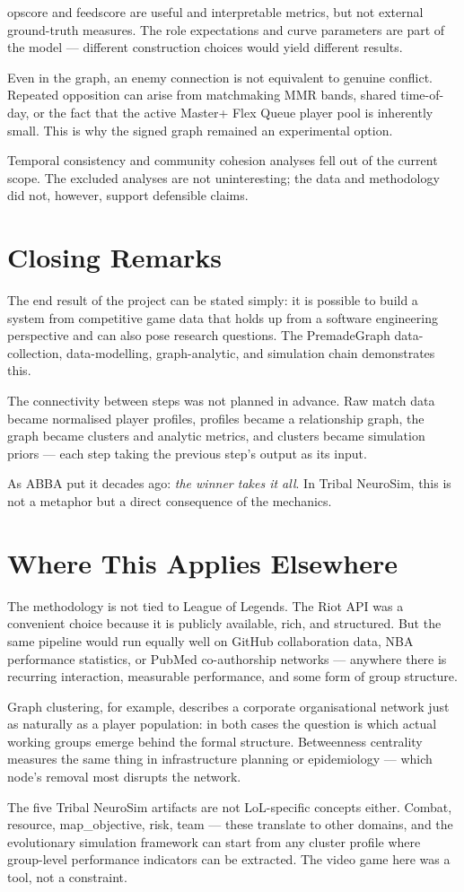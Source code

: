 opscore and feedscore are useful and interpretable metrics, but not external ground-truth measures. The role expectations and curve parameters are part of the model --- different construction choices would yield different results.

Even in the graph, an enemy connection is not equivalent to genuine conflict. Repeated opposition can arise from matchmaking MMR bands, shared time-of-day, or the fact that the active Master+ Flex Queue player pool is inherently small. This is why the signed graph remained an experimental option.

Temporal consistency and community cohesion analyses fell out of the current scope. The excluded analyses are not uninteresting; the data and methodology did not, however, support defensible claims.

\section{Closing Remarks}

The end result of the project can be stated simply: it is possible to build a system from competitive game data that holds up from a software engineering perspective and can also pose research questions. The PremadeGraph data-collection, data-modelling, graph-analytic, and simulation chain demonstrates this.

The connectivity between steps was not planned in advance. Raw match data became normalised player profiles, profiles became a relationship graph, the graph became clusters and analytic metrics, and clusters became simulation priors --- each step taking the previous step's output as its input.

As ABBA put it decades ago: \textit{the winner takes it all}.
In Tribal NeuroSim, this is not a metaphor but a direct consequence of the mechanics.

\section{Where This Applies Elsewhere}
\label{sec:osszegzes-transfer}

The methodology is not tied to League of Legends. The Riot API was a convenient choice because it is publicly available, rich, and structured. But the same pipeline would run equally well on GitHub collaboration data, NBA performance statistics, or PubMed co-authorship networks --- anywhere there is recurring interaction, measurable performance, and some form of group structure.

Graph clustering, for example, describes a corporate organisational network just as naturally as a player population: in both cases the question is which actual working groups emerge behind the formal structure. Betweenness centrality measures the same thing in infrastructure planning or epidemiology --- which node's removal most disrupts the network.

The five Tribal NeuroSim artifacts are not LoL-specific concepts either. Combat, resource, map\_objective, risk, team --- these translate to other domains, and the evolutionary simulation framework can start from any cluster profile where group-level performance indicators can be extracted. The video game here was a tool, not a constraint.
